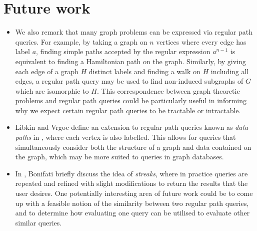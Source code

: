 \documentclass{article}
\begin{document}
\section{Future work}
\label{sec:future_work}

\begin{itemize}
    \item We also remark that many graph problems can be expressed via regular path queries. For example, by taking a graph on $n$ vertices where every edge has label $a$, finding simple paths accepted by the regular expression $a^{n-1}$ is equivalent to finding a Hamiltonian path on the graph. Similarly, by giving each edge of a graph $H$ distinct labels and finding a walk on $H$ including all edges, a regular path query may be used to find non-induced subgraphs of $G$ which are isomorphic to $H$. This correspondence between graph theoretic problems and regular path queries could be particularly useful in informing why we expect certain regular path queries to be tractable or intractable.
    \item Libkin and Vrgoc define an extension to regular path queries known as \emph{data paths} in \cite{libkinRegularPathQueries2012}, where each vertex is also labelled. This allows for queries that simultaneously consider both the structure of a graph and data contained on the graph, which may be more suited to queries in graph databases.
    \item In \cite{bonifatiAnalyticalStudyLarge2020}, Bonifati briefly discuss the idea of \emph{streaks}, where in practice queries are repeated and refined with slight modifications to return the results that the user desires. One potentially interesting area of future work could be to come up with a feasible notion of the similarity between two regular path queries, and to determine how evaluating one query can be utilised to evaluate other similar queries.

\end{itemize}



\end{document}
